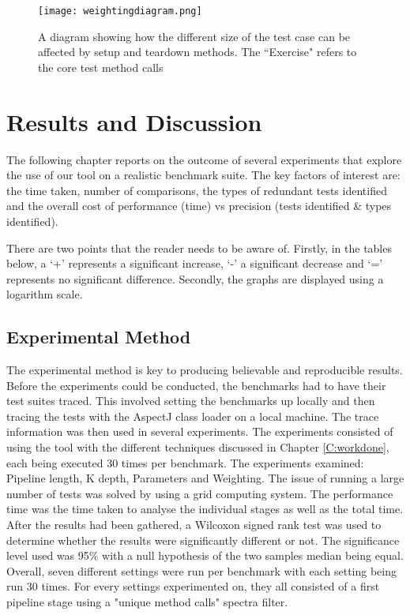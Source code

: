 \documentclass[11pt
              , a4paper
              , twoside
              , openright
              ]{report}
\begin{document}
\begin{figure}[h]
\texttt{[image: weightingdiagram.png]}
\caption{A diagram showing how the different size of the test case can be affected by setup and teardown methods. The ``Exercise" refers to the core test method calls}
\label{fig:weightingdiagram}
\end{figure} \newpage 
 \newpage \chapter{Results and Discussion}\label{C:results}\label{C:evaluation}

The following chapter reports on the outcome of several experiments that explore the use of our tool on a realistic benchmark suite. The key factors of interest are: the time taken, number of comparisons, the types of redundant tests identified and the overall cost of performance (time) vs precision (tests identified \& types identified).

There are two points that the reader needs to be aware of. Firstly, in the tables below, a `+' represents a significant increase, `-' a significant decrease and `=' represents no significant difference. Secondly, the graphs are displayed using a logarithm scale.

\section{Experimental Method}

The experimental method is key to producing believable and reproducible results. Before the experiments could be conducted, the benchmarks had to have their test suites traced. This involved setting the benchmarks up locally and then tracing the tests with the AspectJ class loader on a local machine. The trace information was then used in several experiments. The experiments consisted of using the tool with the different techniques discussed in Chapter \ref{C:workdone}, each being executed 30 times per benchmark. The experiments examined: Pipeline length, K depth, Parameters and Weighting. The issue of running a large number of tests was solved by using a grid computing system. The performance time was the time taken to analyse the individual stages as well as the total time. After the results had been gathered, a Wilcoxon signed rank test \cite{wilcoxon1945individual} was used to determine whether the results were significantly different or not. The significance level used was 95\% with a null hypothesis of the two samples median being equal. Overall, seven different settings were run per benchmark with each setting being run 30 times. For every settings experimented on, they all consisted of a first pipeline stage using a "unique method calls" spectra filter. 
\end{document}
